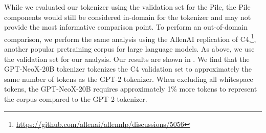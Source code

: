 \documentclass[11pt]{article}
\newcommand{\model}{GPT-NeoX-20B}
\begin{document}
While we evaluated our tokenizer using the validation set for the Pile, the Pile components would still be considered in-domain for the tokenizer and may not provide the most informative comparison point. To perform an out-of-domain comparison, we perform the same analysis using the AllenAI replication of C4,\footnote{\url{https://github.com/allenai/allennlp/discussions/5056}}, another popular pretraining corpus for large language models. As above, we use the validation set for our analysis. Our results are shown in . We find that the \model{} tokenizer tokenizes the C4 validation set to approximately the same number of tokens as the GPT-2 tokenizer. When excluding all whitespace tokens, the \model{} requires approximately 1\% more tokens to represent the corpus compared to the GPT-2 tokenizer.
\end{document}
